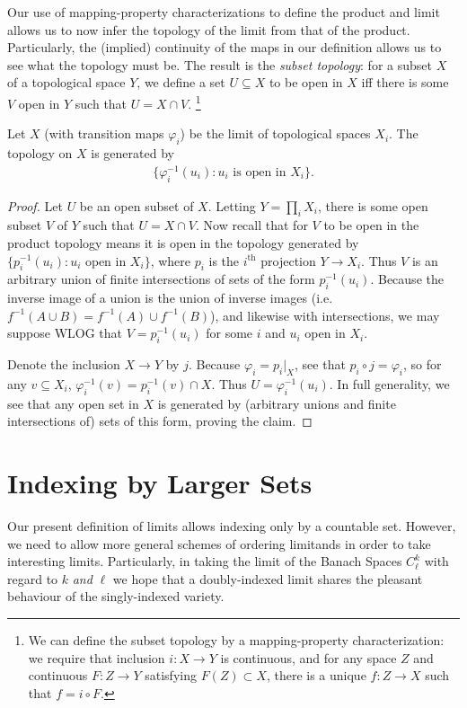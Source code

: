       Our use of mapping-property characterizations to define the product and limit allows us to now infer the topology of the limit from that of the product.
      Particularly, the (implied) continuity of the maps in our definition allows us to see what the topology must be.
      The result is the \emph{subset topology}: for a subset $X$ of a topological space $Y$, we define a set $U\subseteq X$ to be open in $X$ iff there is some $V$ open in $Y$ such that $U=X\cap V$.%
      \footnote{We can define the subset topology by a mapping-property characterization: we require that inclusion $i:X\rightarrow Y$ is continuous, and for any space $Z$ and continuous $F:Z\rightarrow Y$ satisfying $F(Z)\subset X$, there is a unique $f:Z\rightarrow X$ such that $f=i\circ F$.}

      \begin{claim}
        Let $X$ (with transition maps $\varphi_i$) be the limit of topological spaces $X_i$.
        The topology on $X$ is generated by
        \begin{align*}
          \{\varphi_i^{-1}(u_i):u_i\text{ is open in } X_i\}\text{.}
        \end{align*}
        \begin{proof}
          Let $U$ be an open subset of $X$.
          Letting $Y=\prod_i X_i$, there is some open subset $V$ of $Y$ such that $U=X\cap V$.
          Now recall that for $V$ to be open in the product topology means it is open in the topology generated by $\{p_i^{-1}(u_i):u_i\text{ open in }X_i\}$, where $p_i$ is the $i^\text{th}$ projection $Y\rightarrow X_i$.
          Thus $V$ is an arbitrary union of finite intersections of sets of the form $p_i^{-1}(u_i)$.
          Because the inverse image of a union is the union of inverse images (i.e. $f^{-1}(A\cup B)=f^{-1}(A)\cup f^{-1}(B)$), and likewise with intersections, we may suppose WLOG that $V=p_i^{-1}(u_i)$ for some $i$ and $u_i$ open in $X_i$.
      
          Denote the inclusion $X\rightarrow Y$ by $j$.
          Because $\varphi_i=p_i|_X$, see that $p_i\circ j = \varphi_i$, so for any $v\subseteq X_i$, $\varphi_i^{-1}(v) = p_i^{-1}(v)\cap X$.
          Thus $U=\varphi_i^{-1}(u_i)$.
          In full generality, we see that any open set in $X$ is generated by (arbitrary unions and finite intersections of) sets of this form, proving the claim.
        \end{proof}
      \end{claim}

    \section{Indexing by Larger Sets}
      Our present definition of limits allows indexing only by a countable set.
      However, we need to allow more general schemes of ordering limitands in order to take interesting limits.
      Particularly, in taking the limit of the Banach Spaces $C^k_\ell$ with regard to $k$ \emph{and} $\ell$ we hope that a doubly-indexed limit shares the pleasant behaviour of the singly-indexed variety.
      

